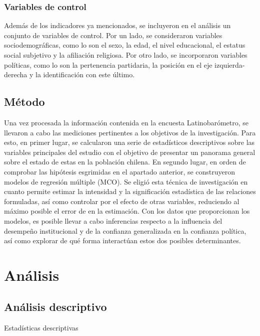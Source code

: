 \documentclass[12pt,twoside]{templates/facsothesis}
\begin{document}
\subsection{Variables de control}\label{variables-de-control}

Además de los indicadores ya mencionados, se incluyeron en el análisis un conjunto de variables de control. Por un lado, se consideraron variables sociodemográficas, como lo son el sexo, la edad, el nivel educacional, el estatus social subjetivo y la afiliación religiosa. Por otro lado, se incorporaron variables políticas, como lo son la pertenencia partidaria, la posición en el eje izquierda-derecha y la identificación con este último.

\section{Método}\label{muxe9todo}

Una vez procesada la información contenida en la encuesta Latinobarómetro, se llevaron a cabo las mediciones pertinentes a los objetivos de la investigación. Para esto, en primer lugar, se calcularon una serie de estadísticos descriptivos sobre las variables principales del estudio con el objetivo de presentar un panorama general sobre el estado de estas en la población chilena. En segundo lugar, en orden de comprobar las hipótesis esgrimidas en el apartado anterior, se construyeron modelos de regresión múltiple (MCO). Se eligió esta técnica de investigación en cuanto permite estimar la intensidad y la significación estadística de las relaciones formuladas, así como controlar por el efecto de otras variables, reduciendo al máximo posible el error de en la estimación. Con los datos que proporcionan los modelos, es posible llevar a cabo inferencias respecto a la influencia del desempeño institucional y de la confianza generalizada en la confianza política, así como explorar de qué forma interactúan estos dos posibles determinantes.

\chapter{Análisis}\label{anuxe1lisis}

\section{Análisis descriptivo}\label{anuxe1lisis-descriptivo}

\label{tab:tabla-1}Estadísticas descriptivas
\end{document}
